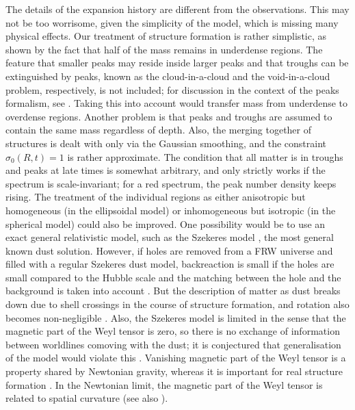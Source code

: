 \documentclass[11pt, a4paper]{article}
\begin{document}
The details of the expansion history are different from the observations. This may not be too worrisome, given the simplicity of the model, which is missing many physical effects. Our treatment of structure formation is rather simplistic, as shown by the fact that half of the mass remains in underdense regions. The feature that smaller peaks may reside inside larger peaks and that troughs can be extinguished by peaks, known as the cloud-in-a-cloud and the void-in-a-cloud problem, respectively, is not included; for discussion in the context of the peaks formalism, see \cite{Paranjape:2012ks, Paranjape:2012jt}. Taking this into account would transfer mass from underdense to overdense regions. Another problem is that peaks and troughs are assumed to contain the same mass regardless of depth.
Also, the merging together of structures is dealt with only via the Gaussian smoothing, and the constraint $\sigma_0(R,t)=1$ is rather approximate. The condition that all matter is in troughs and peaks at late times is somewhat arbitrary, and only strictly works if the spectrum is scale-invariant; for a red spectrum, the peak number density keeps rising.
The treatment of the individual regions as either anisotropic but homogeneous (in the ellipsoidal model) or inhomogeneous but isotropic (in the spherical model) could also be improved. One possibility would be to use an exact general relativistic model, such as the Szekeres model \cite{Szekeres:1975}, the most general known dust solution. However, if holes are removed from a FRW universe and filled with a regular Szekeres dust model, backreaction is small if the holes are small compared to the Hubble scale and the matching between the hole and the background is taken into account \cite{Lavinto:2013exa}.
But the description of matter as dust breaks down due to shell crossings in the course of structure formation, and rotation also becomes non-negligible \cite{Reischke:2016eza}. Also, the Szekeres model is limited in the sense that the magnetic part of the Weyl tensor is zero, so there is no exchange of information between worldlines comoving with the dust; it is conjectured that generalisation of the model would violate this \cite{vanElst:1996zs, *Sopuerta:1997}. Vanishing magnetic part of the Weyl tensor is a property shared by Newtonian gravity, whereas it is important for real structure formation \cite{Kofman:1994pz, Ellis:1971pg, *Ellis:1994md, *Matarrese:1995sb, *vanElst:1998kb, *Ehlers:1997, *Ehlers:2009uv}. In the Newtonian limit, the magnetic part of the Weyl tensor is related to spatial curvature \cite{Rasanen:2011bm} (see also \cite{Clifton:2016mxx}).
\end{document}
